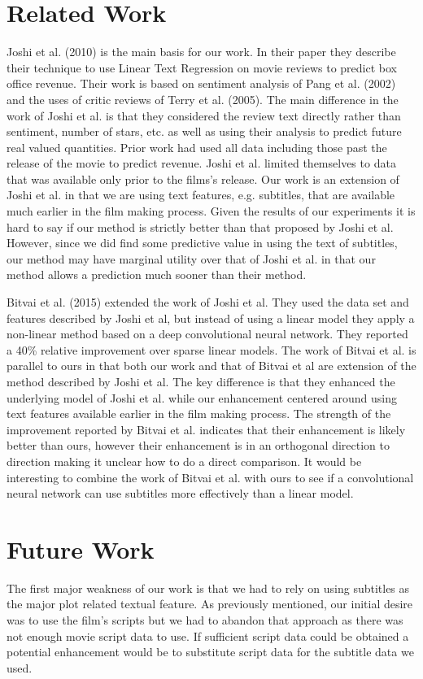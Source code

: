 \documentclass[11pt]{article}
\begin{document}
\section{Related Work}
Joshi et al. (2010) is the main basis for our work. In their paper they describe their
technique to use Linear Text Regression on movie reviews to predict box office revenue.
Their work is based on sentiment analysis of Pang et al. (2002) and the uses of critic
reviews of Terry et al. (2005). The main difference in the work of Joshi et al. is that
they considered the review text directly rather than sentiment, number of stars, etc. as
well as using their analysis to predict future real valued quantities. Prior work had
used all data including those past the release of the movie to predict revenue. Joshi
et al. limited themselves to data that was available only prior to the films's release.
Our work is an extension of Joshi et al. in that we are using text features, e.g.
subtitles, that are available much earlier in the film making process. Given the results
of our experiments it is hard to say if our method is strictly better than that proposed
by Joshi et al. However, since we did find some predictive value in using the text of
subtitles, our method may have marginal utility over that of Joshi et al. in that our
method allows a prediction much sooner than their method.

Bitvai et al. (2015) extended the work of Joshi et al. They used the data set and
features described by Joshi et al, but instead of using a linear model they apply
a non-linear method based on a deep convolutional neural network. They reported a 40\%
relative improvement over sparse linear models. The work of Bitvai et al. is parallel to
ours in that both our work and that of Bitvai et al are extension of the method described
by Joshi et al. The key difference is that they enhanced the underlying model of Joshi
et al. while our enhancement centered around using text features available earlier
in the film making process. The strength of the improvement reported by Bitvai et al. 
indicates that their enhancement is likely better than ours, however their enhancement is
in an orthogonal direction to direction making it unclear how to do a direct comparison.
It would be interesting to combine the work of Bitvai et al. with ours to see if a
convolutional neural network can use subtitles more effectively than a linear model.

\section{Future Work}
The first major weakness of our work is that we had to rely on using subtitles as the
major plot related textual feature. As previously mentioned, our initial desire was to
use the film's scripts but we had to abandon that approach as there was not enough
movie script data to use. If sufficient script data could be obtained a potential
enhancement would be to substitute script data for the subtitle data we used.
\end{document}
